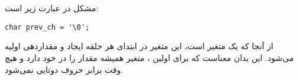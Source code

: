 \section{}
\paragraph{}\label{answer:106}
مشکل در عبارت زیر است:
\begin{LTR}
    \begin{lstlisting}[style=C++Style]
        char prev_ch = '\0';
    \end{lstlisting}
\end{LTR}

از آنجا که  یک متغیر  است، این متغیر در ابتدای هر حلقه ایجاد و مقداردهی اولیه می‌شود. این بدان معناست که برای اولین ، متغیر  همیشه مقدار  را در خود دارد و هیچ وقت برابر حروف دوتایی نمی‌شود.